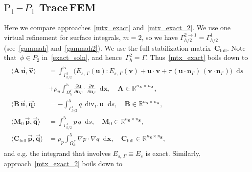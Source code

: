 \documentclass[12pt]{article}
\newcommand{\vect}[1]{\boldsymbol{\mathbf{#1}}}
\newcommand*\diff{\mathop{}\!\mathrm{d}}
\DeclareMathOperator{\Div}{div}
\begin{document}
\subsection{$\text{P}_1$\,--\,$P_1$ Trace\,FEM}

Here we compare approaches~\eqref{mtx_exact} and~\eqref{mtx_exact_2}. We use one virtual refinement for surface integrals, $m = 2$, so we have $\Gamma_{h/2}^{2 \to 1} = \Gamma_{h/2}^1$ (see~\eqref{gammah} and~\eqref{gammah2}). We use the full stabilization matrix~$\vect C_{\text{full}}$. Note that~$\phi \in P_2$ in~\eqref{exact_soln}, and hence~$\Gamma_h^2 = \Gamma$. Thus~\eqref{mtx_exact} boils down to
\begin{align}\begin{split}\label{mtx_exact_p1}
	\langle \vect A\,\vec{\vect u}, \vec{\vect v} \rangle &= 
		\int^5_{\Gamma_{h/2}^1} \big( E_{s,\,\Gamma}(\vect u) : E_{s,\,\Gamma}(\vect v) + \vect u\cdot\vect v + \tau\,(\vect u\cdot\vect n_{\Gamma})\,(\vect v\cdot\vect n_{\Gamma}) \big) \diff{s} \\
	&
		+ \rho_u \int^5_{\Omega_h^{\Gamma}} \frac{\partial \vect u}{\partial\vect n_{\Gamma}}\cdot\frac{\partial \vect v}{\partial\vect n_{\Gamma}} \diff{\vect x}, \quad \vect A \in \mathbb R^{n_{\vect A} \times n_{\vect A}},\\
	\langle \vect B\,\vec{\vect u}, \vec{\vect q} \rangle &= 
		-\int^5_{\Gamma_{h/2}^1} q\,\Div_{\Gamma} \vect u \diff{s}, \quad \vect B \in \mathbb R^{n_{\vect S} \times n_{\vect A}},\\
	\langle \vect M_0\,\vec{\vect p}, \vec{\vect q} \rangle &=
		\int^5_{\Gamma_{h/2}^1} p\,q \diff{s}, \quad \vect M_0 \in \mathbb R^{n_{\vect S} \times n_{\vect S}},\\
	\langle \vect C_{\text{full}}\,\vec{\vect p}, \vec{\vect q} \rangle &=
		\rho_p \int^5_{\Omega^{\Gamma}_h} \nabla p \cdot \nabla q \diff{\vect x}, \quad \vect C_{\text{full}} \in \mathbb R^{n_{\vect S} \times n_{\vect S}},		 
\end{split}\end{align}
and e.g. the integrand that involves $E_{s,\,\Gamma} \equiv E_s$ is exact. Similarly, approach~\eqref{mtx_exact_2} boils down to
\end{document}
